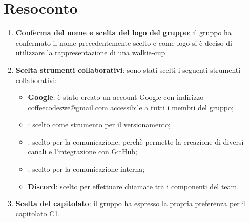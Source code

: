 \documentclass{article}
\begin{document}
\section{Resoconto}%
\label{resoconto}
\begin{enumerate}
  \item \textbf{Conferma del nome e scelta del logo del gruppo}: il gruppo ha confermato il nome precedentemente scelto e come logo si è deciso di utilizzare la rappresentazione di una walkie-cup
  \item \textbf{Scelta strumenti collaborativi}: sono stati scelti i seguenti strumenti collaborativi:
  \begin{itemize}
    \item \textbf{ Google}: è stato creato un account Google con indirizzo \href{mailto:coffeecodeswe@gmail.com}{coffeecodeswe@gmail.com} accessibile a tutti i membri del gruppo;
    \item \textbf{}: scelto come strumento per il versionamento;
    \item \textbf{}: scelto per la comunicazione, perchè permette la creazione di diversi canali e l'integrazione con GitHub;
    \item \textbf{}: scelto per la comunicazione interna;
    \item \textbf{Discord}: scelto per effettuare chiamate tra i componenti del team.
  \end{itemize}
  \item \textbf{Scelta del capitolato}: il gruppo ha espresso la propria preferenza per il capitolato C1.
\end{enumerate}
\end{document}
